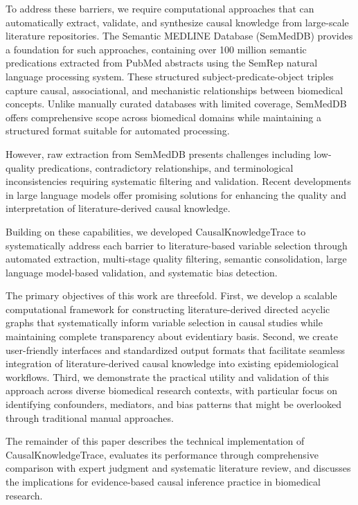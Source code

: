 \documentclass[preprint,12pt,numbers,sort&compress]{elsarticle}
\begin{document}
To address these barriers, we require computational approaches that can automatically extract, validate, and synthesize causal knowledge from large-scale literature repositories. The Semantic MEDLINE Database (SemMedDB) provides a foundation for such approaches, containing over 100 million semantic predications extracted from PubMed abstracts using the SemRep natural language processing system. \cite{kilicoglu2012semmeddb} These structured subject-predicate-object triples capture causal, associational, and mechanistic relationships between biomedical concepts. Unlike manually curated databases with limited coverage, SemMedDB offers comprehensive scope across biomedical domains while maintaining a structured format suitable for automated processing.

However, raw extraction from SemMedDB presents challenges including low-quality predications, contradictory relationships, and terminological inconsistencies requiring systematic filtering and validation. Recent developments in large language models offer promising solutions for enhancing the quality and interpretation of literature-derived causal knowledge. \cite{thirunavukarasu2023large}

Building on these capabilities, we developed CausalKnowledgeTrace to systematically address each barrier to literature-based variable selection through automated extraction, multi-stage quality filtering, semantic consolidation, large language model-based validation, and systematic bias detection. \cite{ding2015adjust}

The primary objectives of this work are threefold. First, we develop a scalable computational framework for constructing literature-derived directed acyclic graphs that systematically inform variable selection in causal studies while maintaining complete transparency about evidentiary basis. Second, we create user-friendly interfaces and standardized output formats that facilitate seamless integration of literature-derived causal knowledge into existing epidemiological workflows. Third, we demonstrate the practical utility and validation of this approach across diverse biomedical research contexts, with particular focus on identifying confounders, mediators, and bias patterns that might be overlooked through traditional manual approaches.

The remainder of this paper describes the technical implementation of CausalKnowledgeTrace, evaluates its performance through comprehensive comparison with expert judgment and systematic literature review, and discusses the implications for evidence-based causal inference practice in biomedical research.
\end{document}
